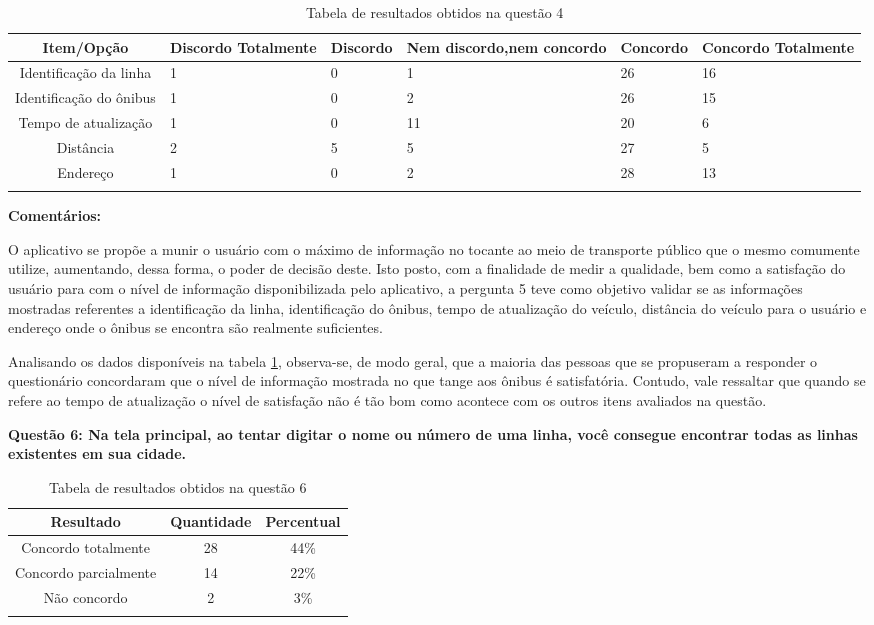 \begin{center}
\begin{longtable}{c|p{1cm}|p{1cm}|p{2cm}|p{1cm}|p{1cm}}
\hline
    \multicolumn{1}{c}{\textbf{Item/Opção}} & \multicolumn{1}{c}{\textbf{Discordo Totalmente}} & \multicolumn{1}{c}{\textbf{Discordo}} & \multicolumn{1}{c}{\textbf{Nem discordo,nem concordo}} & \multicolumn{1}{c}{\textbf{Concordo}} & \multicolumn{1}{c}{\textbf{Concordo Totalmente}} \\
\hline
    Identificação da linha & 1 & 0 & 1 & 26 & 16\\
    \hline
    Identificação do ônibus & 1 & 0 & 2 & 26 & 15\\
    \hline
     Tempo de atualização & 1 & 0 & 11 & 20 & 6\\
    \hline
    Distância & 2 & 5 & 5 & 27 & 5\\
    \hline
     Endereço & 1 & 0 & 2 & 28 & 13\\
     \hline
\caption{Tabela de resultados obtidos na questão 4}
\label{tabq5}
\end{longtable}
\end{center}


\textbf{Comentários:}

O aplicativo se propõe a munir o usuário com o máximo de informação no tocante ao meio de transporte público que o mesmo comumente utilize, aumentando, dessa forma, o poder de decisão deste. Isto posto, com a finalidade de medir a qualidade, bem como a satisfação do usuário para com o nível de informação disponibilizada pelo aplicativo, a pergunta 5 teve como objetivo validar se as informações mostradas referentes a identificação da linha, identificação do ônibus, tempo de atualização do veículo, distância do veículo para o usuário e endereço onde o ônibus se encontra são realmente suficientes.
	
Analisando os dados disponíveis na tabela \ref{tabq5}, observa-se, de modo geral, que a maioria das pessoas que se propuseram a responder o questionário concordaram que o nível de informação mostrada no que tange aos ônibus é satisfatória. Contudo, vale ressaltar que quando se refere ao tempo de atualização o nível de satisfação não é tão bom como acontece com os outros itens avaliados na questão.\newline

\textbf{Questão 6: Na tela principal, ao tentar digitar o nome ou número de uma linha, você consegue encontrar todas as linhas existentes em sua cidade.}

\begin{center}
\begin{longtable}{c|c|c}
\hline
    \multicolumn{1}{c}{\textbf{Resultado}} & \multicolumn{1}{c}{\textbf{Quantidade}} & \multicolumn{1}{c}{\textbf{Percentual}} \\
\hline
    Concordo totalmente & 28 &  44\%\\
    \hline
    Concordo parcialmente & 14 & 22\%\\
    \hline
     Não concordo & 2 & 3\%\\
    \hline
\caption{Tabela de resultados obtidos na questão 6}
\label{tabq6}
\end{longtable}
\end{center}


